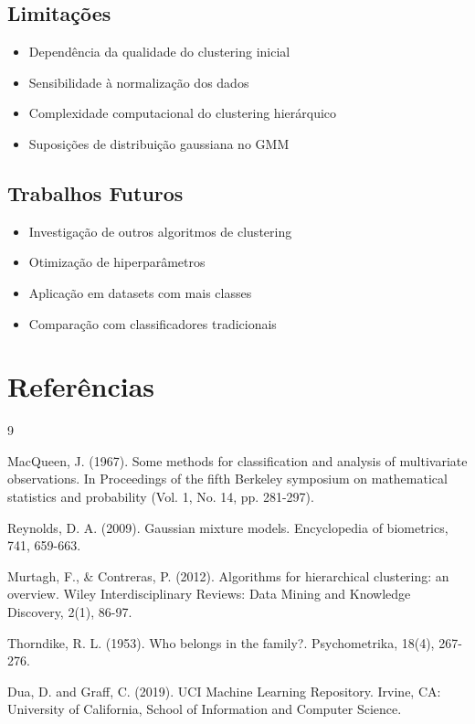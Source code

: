 \documentclass[12pt,a4paper]{article}
\begin{document}
\subsection{Limitações}

\begin{itemize}
    \item Dependência da qualidade do clustering inicial
    \item Sensibilidade à normalização dos dados
    \item Complexidade computacional do clustering hierárquico
    \item Suposições de distribuição gaussiana no GMM
\end{itemize}

\subsection{Trabalhos Futuros}

\begin{itemize}
    \item Investigação de outros algoritmos de clustering
    \item Otimização de hiperparâmetros
    \item Aplicação em datasets com mais classes
    \item Comparação com classificadores tradicionais
\end{itemize}

\section{Referências}

\begin{thebibliography}{9}

MacQueen, J. (1967). Some methods for classification and analysis of multivariate observations. In Proceedings of the fifth Berkeley symposium on mathematical statistics and probability (Vol. 1, No. 14, pp. 281-297).

Reynolds, D. A. (2009). Gaussian mixture models. Encyclopedia of biometrics, 741, 659-663.

Murtagh, F., \& Contreras, P. (2012). Algorithms for hierarchical clustering: an overview. Wiley Interdisciplinary Reviews: Data Mining and Knowledge Discovery, 2(1), 86-97.

Thorndike, R. L. (1953). Who belongs in the family?. Psychometrika, 18(4), 267-276.

Dua, D. and Graff, C. (2019). UCI Machine Learning Repository. Irvine, CA: University of California, School of Information and Computer Science.

\end{thebibliography}
\end{document}
